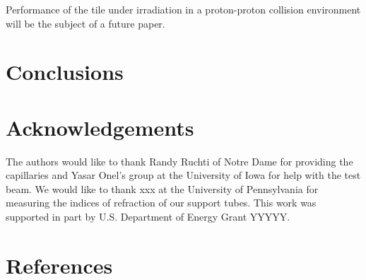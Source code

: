 \documentclass[review]{elsarticle}
\begin{document}
Performance of the tile under irradiation in a proton-proton collision environment will be the subject of a future paper.

\section{Conclusions}

\section{Acknowledgements}
The authors would like to thank Randy Ruchti of Notre Dame for providing the capillaries and Yasar Onel's group at the University of Iowa for help with the test beam.  We would like to thank xxx at the University of Pennsylvania for measuring the indices of refraction of our support tubes.
This work was supported in part by U.S. Department of Energy Grant YYYYY.

\section*{References}


\end{document}
